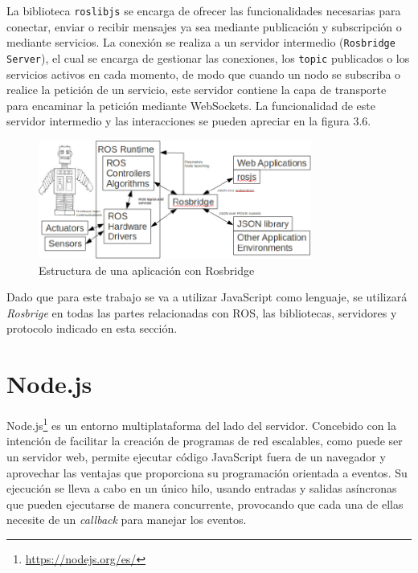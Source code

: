 La biblioteca \texttt{roslibjs} se encarga de ofrecer las funcionalidades necesarias para conectar, enviar o recibir mensajes ya sea mediante publicación y subscripción o mediante servicios. La conexión se realiza a un servidor intermedio (\texttt{Rosbridge Server}), el cual se encarga de gestionar las conexiones, los \texttt{topic} publicados o los servicios activos en cada momento, de modo que cuando un nodo se subscriba o realice la petición de un servicio, este servidor contiene la capa de transporte para encaminar la petición mediante WebSockets. La funcionalidad de este servidor intermedio y las interacciones se pueden apreciar en la figura 3.6.

\begin{figure}[H]
  \begin{center}
    \includegraphics[width=0.8\textwidth]{figures/estructurarosbridge.png}
		\caption{Estructura de una aplicación con Rosbridge}
		\label{fig.estructurarosbridge}
		\end{center}
\end{figure}

Dado que para este trabajo se va a utilizar JavaScript como lenguaje, se utilizará \textit{Rosbrige} en todas las partes relacionadas con ROS, las bibliotecas, servidores y protocolo indicado en esta sección.
\section{Node.js}
Node.js\footnote{\url{https://nodejs.org/es/}} es un entorno multiplataforma del lado del servidor. Concebido con la intención de facilitar la creación de programas de red escalables, como puede ser un servidor web, permite ejecutar código JavaScript fuera de un navegador y aprovechar las ventajas que proporciona su programación orientada a eventos. Su ejecución se lleva a cabo en un único hilo, usando entradas y salidas asíncronas que pueden ejecutarse de manera concurrente, provocando que cada una de ellas necesite de un \textit{callback} para manejar los eventos. 

